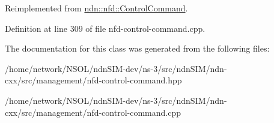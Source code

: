 Reimplemented from \hyperlink{classndn_1_1nfd_1_1ControlCommand_a479414f06f65e7ad819c94e365fa0981}{ndn\+::nfd\+::\+Control\+Command}.



Definition at line 309 of file nfd-\/control-\/command.\+cpp.



The documentation for this class was generated from the following files\+:\begin{DoxyCompactItemize}
\item 
/home/network/\+N\+S\+O\+L/ndn\+S\+I\+M-\/dev/ns-\/3/src/ndn\+S\+I\+M/ndn-\/cxx/src/management/nfd-\/control-\/command.\+hpp\item 
/home/network/\+N\+S\+O\+L/ndn\+S\+I\+M-\/dev/ns-\/3/src/ndn\+S\+I\+M/ndn-\/cxx/src/management/nfd-\/control-\/command.\+cpp\end{DoxyCompactItemize}
